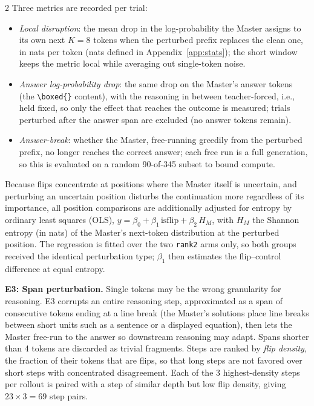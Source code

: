 \documentclass[9pt]{article}
\begin{document}
\begin{multicols}{2}
Three metrics are recorded per trial:
\begin{itemize}\setlength\itemsep{1pt}
  \item \emph{Local disruption}: the mean drop in the log-probability the
        Master assigns to its own next $K{=}8$ tokens when the perturbed
        prefix replaces the clean one, in nats per token (nats defined in
        Appendix~\ref{app:stats}); the short window keeps the metric local
        while averaging out single-token noise.
  \item \emph{Answer log-probability drop}: the same drop on the Master's
        answer tokens (the \texttt{\textbackslash boxed\{\}} content), with
        the reasoning in between teacher-forced, i.e., held fixed, so only
        the effect that reaches the outcome is measured; trials perturbed
        after the answer span are excluded (no answer tokens remain).
  \item \emph{Answer-break}: whether the Master, free-running greedily from
        the perturbed prefix, no longer reaches the correct answer; each
        free run is a full generation, so this is evaluated on a random
        90-of-345 subset to bound compute.
\end{itemize}

Because flips concentrate at positions where the Master itself is uncertain,
and perturbing an uncertain position disturbs the continuation more regardless
of its importance, all position comparisons are additionally adjusted for
entropy by ordinary least squares (OLS),
$y = \beta_0 + \beta_1\,\mathrm{isflip} + \beta_2\,H_M$, with $H_M$ the
Shannon entropy (in nats) of the Master's next-token distribution at the
perturbed position. The regression is fitted over the two \texttt{rank2} arms
only, so both groups received the identical perturbation type; $\beta_1$
then estimates the flip--control difference at equal entropy.

\textbf{E3: Span perturbation.} Single tokens may be the wrong granularity for
reasoning. E3 corrupts an entire reasoning step, approximated as a span of
consecutive tokens ending at a line break (the Master's solutions place line
breaks between short units such as a sentence or a displayed equation), then
lets the Master free-run to the answer so downstream reasoning may adapt.
Spans shorter than 4 tokens are discarded as trivial fragments. Steps are
ranked by \emph{flip density}, the fraction of their tokens that are flips, so
that long steps are not favored over short steps with concentrated
disagreement. Each of the 3 highest-density steps per rollout is paired with a
step of similar depth but low flip density, giving $23 \times 3 = 69$ step
pairs.


\end{multicols}
\end{document}
